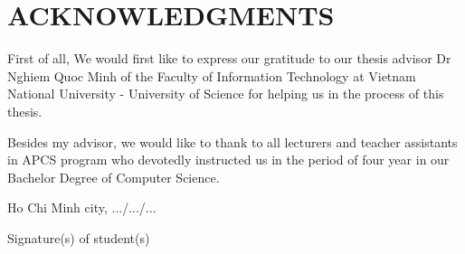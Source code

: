 \chapter*{ACKNOWLEDGMENTS}
\label{thanks}

First of all, We would first like to express our gratitude to our thesis advisor Dr Nghiem Quoc Minh of the Faculty of Information Technology at Vietnam National University - University of Science for helping us in the process of this thesis.

Besides my advisor, we would like to thank to all lecturers and teacher assistants in APCS program who devotedly instructed us in the period of four year in our Bachelor Degree of Computer Science. 




\vspace{3cm}
\hspace{7cm}
\begin{minipage}[ht]{0.48\textwidth}
\begin{center}
Ho Chi Minh city, .../.../...

Signature(s) of student(s) 

\tenSV  ~~~~~~~   \tenSVt 
\end{center}
\end{minipage}
